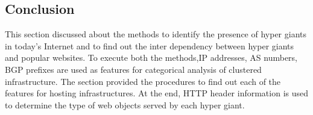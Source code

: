\subsection{Conclusion}
This section discussed about the methods to identify the presence of hyper giants in today's Internet and to find out the inter dependency between hyper giants and popular websites. To execute both the methods,IP addresses, AS numbers, BGP prefixes are used as features for categorical analysis of clustered infrastructure. The section provided the procedures to find out each of the features for hosting infrastructures. At the end, HTTP header information is used to determine the type of web objects served by each hyper giant.
